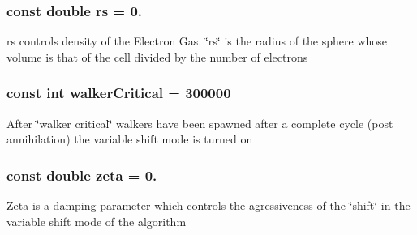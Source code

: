 \hypertarget{UEG__MAIN__binarytest_8C_a363ad74e3d4570cd6bfaa4622e0af0bd}{
\subsubsection[{rs}]{\setlength{\rightskip}{0pt plus 5cm}const double rs = 0.}}\label{UEG__MAIN__binarytest_8C_a363ad74e3d4570cd6bfaa4622e0af0bd}
rs controls density of the Electron Gas. \char`\"{}rs\char`\"{} is the radius of the sphere whose volume is that of the cell divided by the number of electrons \hypertarget{UEG__MAIN__binarytest_8C_a6c7e0fd46bc659f43a5e2fe841b0aeeb}{
\subsubsection[{walker\-Critical}]{\setlength{\rightskip}{0pt plus 5cm}const int walker\-Critical = 300000}}\label{UEG__MAIN__binarytest_8C_a6c7e0fd46bc659f43a5e2fe841b0aeeb}
After \char`\"{}walker critical\char`\"{} walkers have been spawned after a complete cycle (post annihilation) the variable shift mode is turned on \hypertarget{UEG__MAIN__binarytest_8C_a50fb6782013c8c12243ca553cee0971a}{
\subsubsection[{zeta}]{\setlength{\rightskip}{0pt plus 5cm}const double zeta = 0.}}\label{UEG__MAIN__binarytest_8C_a50fb6782013c8c12243ca553cee0971a}
Zeta is a damping parameter which controls the agressiveness of the \char`\"{}shift\char`\"{} in the variable shift mode of the algorithm 